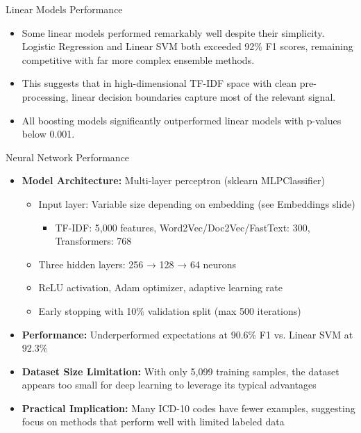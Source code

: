 \documentclass[
    10pt,
    aspectratio=169,
]{beamer}
\begin{document}
\begin{frame}{Linear Models Performance}
\begin{itemize}
    \item Some linear models performed remarkably well despite their simplicity. Logistic Regression and Linear SVM both exceeded 92\% F1 scores, remaining competitive with far more complex ensemble methods.
    \item This suggests that in high-dimensional TF-IDF space with clean pre-processing, linear decision boundaries capture most of the relevant signal.
    \item All boosting models significantly outperformed linear models with p-values below 0.001.
\end{itemize}
\end{frame}

\begin{frame}{Neural Network Performance}
\begin{itemize}
    \item \textbf{Model Architecture:} Multi-layer perceptron (sklearn MLPClassifier)
    \begin{itemize}
        \item Input layer: Variable size depending on embedding (see Embeddings slide)
        \begin{itemize}
            \scriptsize
            \item TF-IDF: 5,000 features, Word2Vec/Doc2Vec/FastText: 300, Transformers: 768
        \end{itemize}
        \item Three hidden layers: 256 → 128 → 64 neurons
        \item ReLU activation, Adam optimizer, adaptive learning rate
        \item Early stopping with 10\% validation split (max 500 iterations)
    \end{itemize}
    \item \textbf{Performance:} Underperformed expectations at 90.6\% F1 vs. Linear SVM at 92.3\%
    \item \textbf{Dataset Size Limitation:} With only 5,099 training samples, the dataset appears too small for deep learning to leverage its typical advantages
    \item \textbf{Practical Implication:} Many ICD-10 codes have fewer examples, suggesting focus on methods that perform well with limited labeled data
\end{itemize}
\end{frame}
\end{document}
